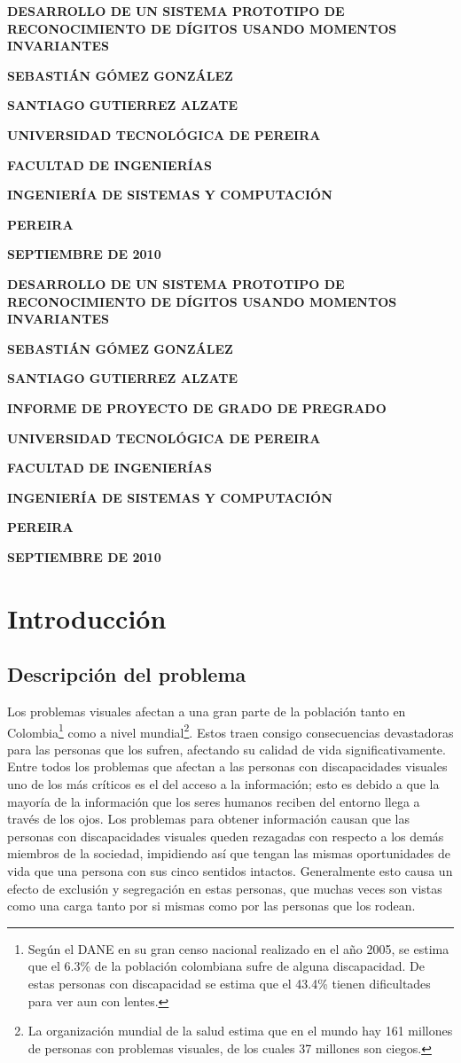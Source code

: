 \documentclass[a4paper, 11pt, oneside]{report}
\newcommand\portada{
	\begin{titlepage}
		\begin{center}
			{\large \bf DESARROLLO DE UN SISTEMA PROTOTIPO DE RECONOCIMIENTO DE DÍGITOS USANDO MOMENTOS INVARIANTES }
			\vfill
			{\large\bf SEBASTIÁN GÓMEZ GONZÁLEZ \par}
			{\large\bf SANTIAGO GUTIERREZ ALZATE \par}
			\vfill
			{\large\bf UNIVERSIDAD TECNOLÓGICA DE PEREIRA  \par}
			{\large\bf FACULTAD DE INGENIERÍAS \par}
			{\large\bf INGENIERÍA DE SISTEMAS Y COMPUTACIÓN \par}
			{\large\bf PEREIRA\par}
			{\large\bf SEPTIEMBRE DE 2010 \par}
		\end{center}
	\end{titlepage}
}
\newcommand\contraportada{
	\begin{titlepage}
		\begin{center}
			{\large \bf DESARROLLO DE UN SISTEMA PROTOTIPO DE RECONOCIMIENTO DE DÍGITOS USANDO MOMENTOS INVARIANTES }
			\vfill
			{\large\bf SEBASTIÁN GÓMEZ GONZÁLEZ \par}
			{\large\bf SANTIAGO GUTIERREZ ALZATE \par}
			\vfill
			{\large\bf INFORME DE PROYECTO DE GRADO DE PREGRADO\par}
			\vfill
			{\large\bf UNIVERSIDAD TECNOLÓGICA DE PEREIRA  \par}
			{\large\bf FACULTAD DE INGENIERÍAS \par}
			{\large\bf INGENIERÍA DE SISTEMAS Y COMPUTACIÓN \par}
			{\large\bf PEREIRA\par}
			{\large\bf SEPTIEMBRE DE 2010 \par}
		\end{center}
	\end{titlepage}
}
\begin{document}
\portada

\contraportada


\tableofcontents

\listoftables

\listoffigures

\chapter{Introducción}
\label{chap:intro}

\section{Descripción del problema}

Los problemas visuales afectan a una gran parte de la población tanto en Colombia\footnote{Según el DANE en su gran censo nacional realizado en el año 2005, se estima que el 6.3\% de la población colombiana sufre de alguna discapacidad. De estas personas con discapacidad se estima que el 43.4\% tienen dificultades para ver aun con lentes.} como a nivel mundial\footnote{La organización mundial de la salud estima que en el mundo hay 161 millones de personas con problemas visuales, de los cuales 37 millones son ciegos.}. Estos traen consigo consecuencias devastadoras para las personas que los sufren, afectando su calidad de vida significativamente. Entre todos los problemas que afectan a las personas con discapacidades visuales uno de los más críticos es el del acceso a la información; esto es debido a que la mayoría de la información que los seres humanos reciben del entorno llega a través de los ojos. Los problemas para obtener información causan que las personas con discapacidades visuales queden rezagadas con respecto a los demás miembros de la sociedad, impidiendo así que tengan las mismas oportunidades de vida que una persona con sus cinco sentidos intactos. Generalmente esto causa un efecto de exclusión y segregación en estas personas, que muchas veces son vistas como una carga tanto por si mismas como por las personas que los rodean. 
\end{document}
